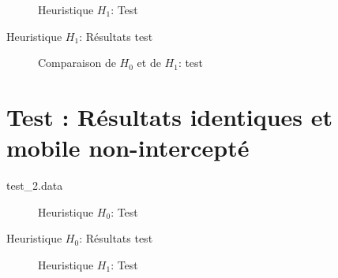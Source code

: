   \begin{figure}[H]
    \begin{center}
      \boxed{
      \begin{tikzpicture}[scale=0.7]
        
      \end{tikzpicture}}
    \end{center}
    \caption{Heuristique $H_1$: Test }
    \label{fig:H1_1}
  \end{figure}

  \begin{table}[H]
    \centering
    
    \caption{Heuristique $H_1$: Résultats test }
    \label{tab:H1_1}
  \end{table}

  \begin{figure}[H]
    \centering
    \boxed{
    \begin{tikzpicture}[yscale=0.5]
      
    \end{tikzpicture}}
    \caption{Comparaison de $H_0$ et de $H_1$: test }
    \label{fig:comp_1}
  \end{figure}

\section{Test : Résultats identiques et mobile non-intercepté}
  \begin{listing}[H]
    \caption{test\_2.data}
  \end{listing}

  \begin{figure}[H]
    \begin{center}
      \boxed{
      \begin{tikzpicture}[scale=1]
        
      \end{tikzpicture}}
    \end{center}
    \caption{Heuristique $H_0$: Test }
    \label{fig:H0_2}
  \end{figure}

  \begin{table}[H]
    \centering
    
    \caption{Heuristique $H_0$: Résultats test }
    \label{tab:H0_2}
  \end{table}

  \begin{figure}[H]
    \begin{center}
      \boxed{
      \begin{tikzpicture}[scale=1]
        
      \end{tikzpicture}}
    \end{center}
    \caption{Heuristique $H_1$: Test }
    \label{fig:H1_2}
  \end{figure}

